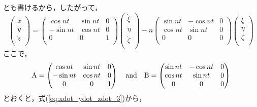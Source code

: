\documentclass[11pt,a4paper,oneside,onecolumn]{jreport}
\begin{document}
とも書けるから，したがって，
\begin{equation}
\begin{pmatrix}
\dot{x}\\
\dot{y}\\
\dot{z}\\
\end{pmatrix}
= 
\begin{pmatrix}
\cos nt & \sin nt & 0\\
- \sin nt & \cos nt & 0\\
0 & 0 & 1\\
\end{pmatrix}
\begin{pmatrix}
\dot{\xi}\\
\dot{\eta}\\
\dot{\zeta}\\
\end{pmatrix}
- n
\begin{pmatrix}
\sin nt & - \cos nt & 0\\
\cos nt & \sin nt & 0\\
0 & 0 & 0\\
\end{pmatrix}
\begin{pmatrix}
\xi\\
\eta\\
\zeta\\
\end{pmatrix} \label{eq:xdot_ydot_zdot_3}
\end{equation}
ここで，
\begin{equation}
{\rm A} = 
\begin{pmatrix}
\cos nt & \sin nt & 0\\
- \sin nt & \cos nt & 0\\
0 & 0 & 1\\
\end{pmatrix}
 \quad {\rm and} \quad 
 {\rm B} = 
\begin{pmatrix}
\sin nt & - \cos nt & 0\\
\cos nt & \sin nt & 0\\
0 & 0 & 0\\
\end{pmatrix}
\end{equation}
とおくと，式(\ref{eq:xdot_ydot_zdot_3})から，
\end{document}
